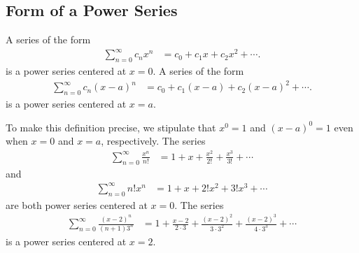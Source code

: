 \documentclass{report}
\begin{document}
    \subsection*{Form of a Power Series}
    \bigbreak \noindent 
    \begin{dfn}
        A series of the form
    \begin{align*}
        \sum_{n=0}^{\infty} c_n x^n &= c_0 + c_1 x + c_2 x^2 + \cdots 
    .\end{align*}
    is a power series centered at \( x = 0 \).
    \bigbreak \noindent 
    A series of the form
    \begin{align*}
        \sum_{n=0}^{\infty} c_n (x - a)^n &= c_0 + c_1 (x - a) + c_2 (x - a)^2 + \cdots 
    .\end{align*}
    is a power series centered at \( x = a \).
    \end{dfn}
    
    \bigbreak \noindent 
    To make this definition precise, we stipulate that \( x^0 = 1 \) and \( (x - a)^0 = 1 \) even when \( x = 0 \) and \( x = a \), respectively.
    \bigbreak \noindent 
    The series
    \begin{align*}
        \sum_{n=0}^{\infty} \frac{x^n}{n!} &= 1 + x + \frac{x^2}{2!} + \frac{x^3}{3!} + \cdots
    \end{align*}
    and
    \begin{align*}
        \sum_{n=0}^{\infty} n! x^n &= 1 + x + 2! x^2 + 3! x^3 + \cdots
    \end{align*}
    are both power series centered at \( x = 0 \).
    \bigbreak \noindent 
    The series
    \begin{align*}
        \sum_{n=0}^{\infty} \frac{(x - 2)^n}{(n + 1)3^n} &= 1 + \frac{x - 2}{2 \cdot 3} + \frac{(x - 2)^2}{3 \cdot 3^2} + \frac{(x - 2)^3}{4 \cdot 3^3} + \cdots
    \end{align*}
    is a power series centered at \( x = 2 \).

    \bigbreak \noindent 
\end{document}
